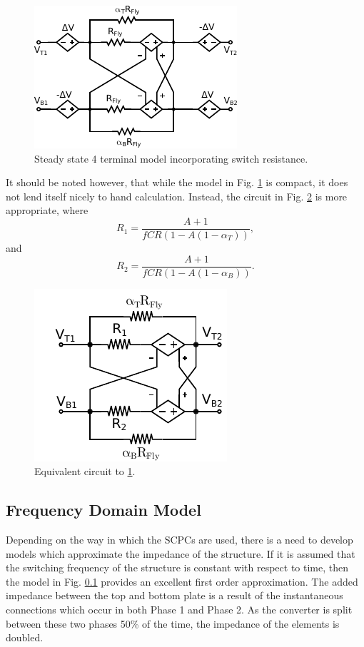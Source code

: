 \begin{figure}
	\centering
	\includegraphics[width=0.5\linewidth]{4Terminal/Figures/CellRes_FSL.pdf}
	\caption{Steady state 4 terminal model incorporating switch resistance.}
	\label{fig:cellresfsl}
\end{figure}
	
	It should be noted however, that while the model in Fig. \ref{fig:cellresfsl} is compact, it does not lend itself nicely to hand calculation. Instead, the circuit in Fig. \ref{fig:cellresfsl2} is more appropriate, where 
	\begin{equation}
		R_{1} = \frac{A+1}{fCR(1-A(1-\alpha_T))},
	\end{equation}
	and
	\begin{equation}
		R_{2}  = \frac{A+1}{fCR(1-A(1-\alpha_B))}.
	\end{equation}
	\begin{figure}
		\centering
		\includegraphics[width=0.4\linewidth]{4Terminal/Figures/CellRes_FSL_2.pdf}
		\caption{Equivalent circuit to \ref{fig:cellresfsl}.}
		\label{fig:cellresfsl2}
	\end{figure}
	
	
	\subsection{Frequency Domain Model}
	Depending on the way in which the SCPCs are used, there is a need to develop models which approximate the impedance of the structure. If it is assumed that the switching frequency of the structure is constant with respect to time, then the model in Fig. \ref{} provides an excellent first order approximation. The added impedance between the top and bottom plate is a result of the instantaneous connections which occur in both Phase 1 and Phase 2. As the converter is split between these two phases 50\% of the time, the impedance of the elements is doubled. 
	

